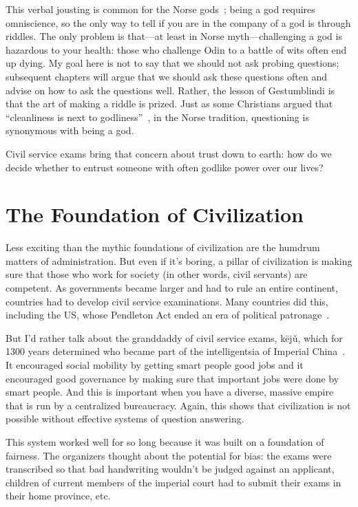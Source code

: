This verbal jousting is common for the Norse gods~\citep{MITCHELL-20};
being a god requires omniscience, so the only way to tell if you are in
the company of a god is through riddles.
%
The only problem is that---at least in Norse myth---challenging a god is
hazardous to your health: those who challenge Odin to a battle of wits
often end up dying.
%
My goal here is not to say that we should not ask probing questions;
subsequent chapters will argue that we should ask these questions
often and advise on how to ask the questions well.
%
Rather, the lesson of Gestumblindi is that the art of making a riddle is prized.
%
Just as some Christians argued that ``cleanliness is next to
godliness''~\citep{wesley-1872}, in the Norse tradition, questioning is synonymous
with being a god.

Civil service exams bring that concern about trust down to earth: how do
we decide whether to entrust someone with often godlike power over our lives?

\section{The Foundation of Civilization}
\label{sec:civil-service}

Less exciting than the mythic foundations of civilization are the humdrum matters of
administration.
%
But even if it's boring, a pillar of civilization is making sure that those who work
for society (in other words, civil servants) are competent.
%
As governments became larger and had to rule an entire continent, countries had to
develop civil service examinations.
%
Many countries did this, including the US, whose Pendleton Act ended an era of political
patronage~\citep{johnson-07}.

But I’d rather talk about the granddaddy of civil service exams, k\={e}j\v{u}, which for
1300 years determined who became part of the intelligentsia of Imperial China~\citep{qian-82}.
%
It encouraged social mobility by getting smart people good jobs and it encouraged good
governance by making sure that important jobs were done by smart people.
%
And this is important when you have a diverse, massive empire that is run by a
centralized bureaucracy.
%
Again, this shows that civilization is not possible without effective systems of
question answering.

This system worked well for so long because it was built on a foundation of fairness.
The organizers thought about the potential for bias: the exams were transcribed so that
bad handwriting wouldn’t be judged against an applicant, children of current members
of the imperial court had to submit their exams in their home province, etc.


